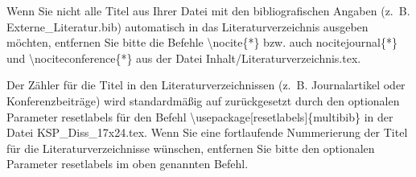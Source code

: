 Wenn Sie nicht alle Titel aus Ihrer Datei mit den bibliografischen Angaben (z.~B. \glqq Externe\_Li\-te\-ra\-tur.bib\grqq{}) automatisch in das Literaturverzeichnis ausgeben möchten, entfernen Sie bitte die Befehle \glqq \textbackslash nocite\{*\}\grqq{} bzw. auch \glqq nocitejournal\{*\}\grqq{} und \glqq \textbackslash nociteconference\{*\}\grqq{} aus der Datei \glqq Inhalt/Literaturverzeichnis.tex\grqq{}.

Der Zähler für die Titel in den Literaturverzeichnissen (z.~B. \glqq Journalartikel\grqq{} oder \glqq Konferenzbeiträge\grqq{}) wird standardmäßig auf \glqq [1]\grqq{} zurückgesetzt durch den optionalen Parameter \glqq resetlabels\grqq{} für den Befehl \glqq \textbackslash usepackage[resetlabels]\{multi\-bib\}\grqq{} in der Datei \glqq KSP\_Diss\_17x24.tex\grqq{}. Wenn Sie eine fortlaufende Nummerierung der Titel für die Literaturverzeichnisse wünschen, entfernen Sie bitte den optionalen Parameter \glqq resetlabels\grqq{} im oben genannten Befehl.
